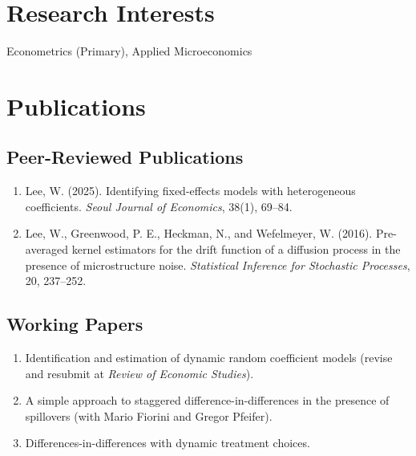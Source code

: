 \documentclass[10pt,letterpaper]{article}
\begin{document}
\section*{Research Interests}

Econometrics (Primary), Applied Microeconomics

\section*{Publications}

\subsection*{Peer-Reviewed Publications}

\begin{enumerate}
\item 
  Lee, W. (2025). 
  Identifying fixed-effects models with heterogeneous coefficients. 
  \textit{Seoul Journal of Economics}, 38(1), 69--84.

\item 
  Lee, W., Greenwood, P. E., Heckman, N., and Wefelmeyer, W. (2016). 
  Pre-averaged kernel estimators for the drift function of a diffusion process in the presence of microstructure noise. 
  \textit{Statistical Inference for Stochastic Processes}, 20, 237--252.
\end{enumerate}

\subsection*{Working Papers}

\begin{enumerate}[resume]
\item Identification and estimation of dynamic random coefficient models (revise and resubmit at \emph{Review of Economic Studies}).
\item A simple approach to staggered difference-in-differences in the presence of spillovers (with Mario Fiorini and Gregor Pfeifer).
\item Differences-in-differences with dynamic treatment choices.
\end{enumerate}
\end{document}
